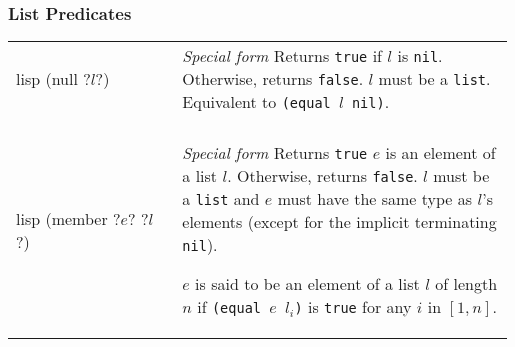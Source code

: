 \documentclass[a4paper, 12pt]{article}
\makeatletter
\newenvironment{funcdefs}
    {\begin{longtable}{@{} x{0.33\linewidth} @{} >{\raggedright\arraybackslash}p{0.66\linewidth} @{}}}
    {\end{longtable}}
\def\specialf/{\textit{Special form}\hspace{0.5em}}
\makeatother
\begin{document}
\subsubsection{List Predicates}
\begin{funcdefs}
    \begin{minipage}[t]{\linewidth}
        \centering
        \begin{cminted}[autogobble=true, escapeinside=??]{lisp}
            (null ?$l$?)
        \end{cminted}
    \end{minipage}
    & \specialf/ Returns \texttt{true} if $l$ is \texttt{nil}. Otherwise, returns \texttt{false}. $l$ must be a \texttt{list}. Equivalent to \texttt{(equal $l$ nil)}.
    \\ \\
    \begin{minipage}[t]{\linewidth}
        \centering
        \begin{cminted}[autogobble=true, escapeinside=??]{lisp}
            (member ?$e$? ?$l$?)
        \end{cminted}
    \end{minipage}
    & \specialf/ Returns \texttt{true} $e$ is an element of a list $l$. Otherwise, returns \texttt{false}. $l$ must be a \texttt{list} and $e$ must have the same type as $l$'s elements (except for the implicit terminating \texttt{nil}).
    \setlength{\parindent}{1.5em}%
    \par\indent%
    $e$ is said to be an element of a list $l$ of length $n$ if \texttt{(equal $e$ $l_i$)} is \texttt{true} for any $i$ in $[1, n]$.
\end{funcdefs}
\end{document}
